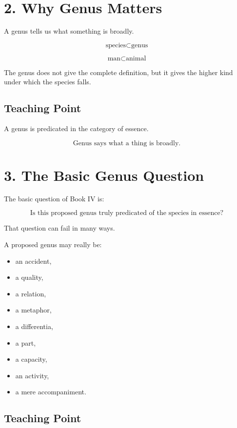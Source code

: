 \documentclass[12pt]{article}
\begin{document}
\section*{2. Why Genus Matters}

A genus tells us what something is broadly.

\[
\text{species} \subset \text{genus}
\]

\[
\text{man} \subset \text{animal}
\]

The genus does not give the complete definition, but it gives the higher kind
under which the species falls.

\subsection*{Teaching Point}

A genus is predicated in the category of essence.

\[
\boxed{
\text{Genus says what a thing is broadly.}
}
\]

\section*{3. The Basic Genus Question}

The basic question of Book IV is:

\[
\boxed{
\text{Is this proposed genus truly predicated of the species in essence?}
}
\]

That question can fail in many ways.

A proposed genus may really be:

\begin{itemize}[itemsep=0.25em]
    \item an accident,
    \item a quality,
    \item a relation,
    \item a metaphor,
    \item a differentia,
    \item a part,
    \item a capacity,
    \item an activity,
    \item a mere accompaniment.
\end{itemize}

\subsection*{Teaching Point}
\end{document}
